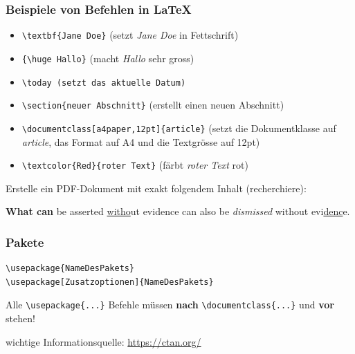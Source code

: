 \begin{frame}[fragile]
\frametitle{Beispiele von Befehlen in \LaTeX}
\begin{itemize}[<+->]
    \item \lstinline[style=LaTeX]|\textbf{Jane Doe}| (setzt \textit{Jane Doe} in Fettschrift)
    \item \lstinline[style=LaTeX]|{\huge Hallo}| (macht \textit{Hallo} sehr gross)
    \item \lstinline[style=LaTeX]|\today (setzt das aktuelle Datum)|
    \item \lstinline[style=LaTeX]|\section{neuer Abschnitt}| (erstellt einen neuen Abschnitt)
    \item \lstinline[style=LaTeX]|\documentclass[a4paper,12pt]{article}| {\small (setzt die Dokumentklasse auf \textit{article}, das Format auf A4 und die Textgrösse auf 12pt)}
    \item \lstinline|\textcolor{Red}{roter Text}| {\small (färbt \textit{roter Text} rot)}
\end{itemize}
\end{frame}

\begin{frame}[fragile]
\begin{myexercise}\label{myexercise:hitchens-razor}
    Erstelle ein PDF-Dokument mit exakt folgendem Inhalt (recherchiere):
    
        \begin{center}
            \textbf{What can} be asserted \underline{witho}ut evidence can also be \textit{dismissed} without evi\underline{denc}e.
        \end{center}
\end{myexercise}
\end{frame}


\begin{frame}[fragile]
\frametitle{Pakete}
\begin{lstlisting}[style=LaTeX]
\usepackage{NameDesPakets}
\usepackage[Zusatzoptionen]{NameDesPakets}
\end{lstlisting}

Alle \lstinline[style=LaTeX]|\usepackage{...}| Befehle müssen \textbf{nach} \lstinline[style=LaTeX]|\documentclass{...}| und \textbf{vor} \lstinline[style=LaTeX]|| stehen!

\vspace{1cm}
wichtige Informationsquelle: \url{https://ctan.org/}
\end{frame}

